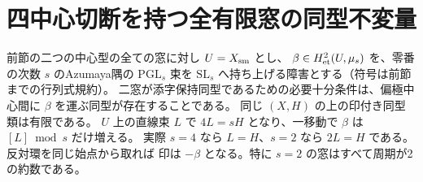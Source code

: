 \section{四中心切断を持つ全有限窓の同型不変量}
\label{sec:central-cut-kummer-classification}
\begin{theorem}\label{thm:central-cut-kummer-classification}
前節の二つの中心型の全ての窓に対し $U=X_{\rm sm}$ とし、
$\beta\in H^2_{\rm et}(U,\mu_s)$ を、零番の次数 $s$ のAzumaya隅の
$\mathrm{PGL}_s$ 束を $\mathrm{SL}_s$ へ持ち上げる障害とする（符号は前節までの行列式規約）。
二窓が添字保持同型であるための必要十分条件は、偏極中心間に $\beta$ を運ぶ同型が存在することである。
同じ $(X,H)$ の上の印付き同型類は有限である。
$U$ 上の直線束 $L$ で $4L=sH$ となり、一移動で $\beta$ は $[L]\bmod s$ だけ増える。
実際 $s=4$ なら $L=H$、$s=2$ なら $2L=H$ である。反対環を同じ始点から取れば
印は $-\beta$ となる。特に $s=2$ の窓はすべて周期が2の約数である。
\end{theorem}
